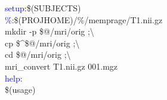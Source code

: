 \documentclass[oneside,11pt]{memoir}
\newcommand{\maker}[2]{\textcolor{blue}{#1}:\enspace#2}
\newcommand{\tab}{\hspace*{4em}}
\begin{document}
\maker{setup}{\$(SUBJECTS)} \\

\maker{\%}{\$(PROJHOME)/\%/memprage/T1.nii.gz} \\
\tab mkdir -p \$@/mri/orig ;\textbackslash \\
\tab cp \$\textasciicircum \$@/mri/orig ;\textbackslash \\
\tab cd \$@/mri/orig ;\textbackslash \\
\tab mri_convert T1.nii.gz 001.mgz \\
	
\maker{help}{} \\
\tab \$(usage) \\
	
\end{document}
